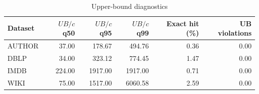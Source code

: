 \begin{table}[H]
\centering
\small
\setlength{\tabcolsep}{5pt}
\caption{Upper-bound diagnostics}
\label{tab:C_bounds}
\begin{tabular}{@{}lrrrrr@{}}
\toprule
Dataset & $UB/c$ q50 & $UB/c$ q95 & $UB/c$ q99 & Exact hit (\%) & UB violations \\
\midrule
AUTHOR & 37.00 & 178.67 & 494.76 & 0.36 & 0.00 \\
DBLP & 34.00 & 323.12 & 774.45 & 1.47 & 0.00 \\
IMDB & 224.00 & 1917.00 & 1917.00 & 0.71 & 0.00 \\
WIKI & 75.00 & 1517.00 & 6060.58 & 2.59 & 0.00 \\
\bottomrule
\end{tabular}
\end{table}
